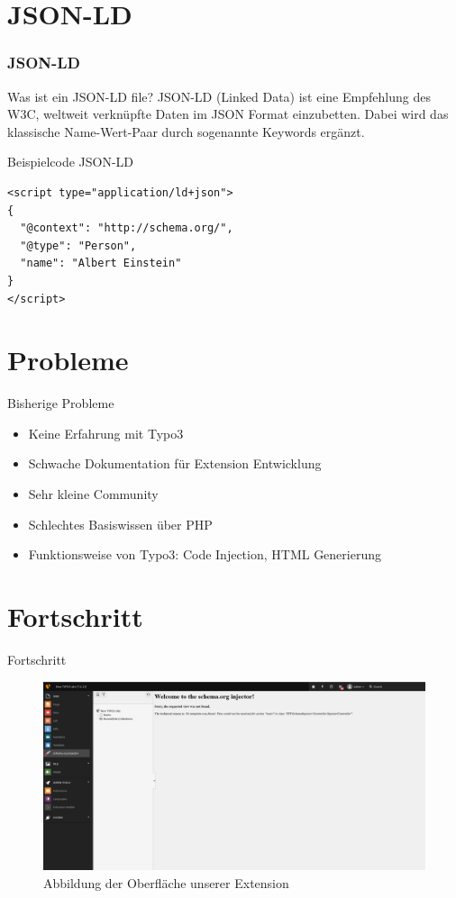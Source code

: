 \documentclass{beamer}
\begin{document}
\section{JSON-LD}

\begin{frame}[fragile]
\frametitle{JSON-LD}
\begin{block}{Was ist ein JSON-LD file?}
JSON-LD (Linked Data) ist eine Empfehlung des W3C, weltweit verknüpfte Daten im JSON Format einzubetten. Dabei wird das klassische Name-Wert-Paar durch sogenannte Keywords ergänzt.
\end{block}

\begin{block}{Beispielcode JSON-LD}
\begin{lstlisting}
<script type="application/ld+json">
{
  "@context": "http://schema.org/",
  "@type": "Person",
  "name": "Albert Einstein"
}
</script>
\end{lstlisting}
\end{block}
\end{frame}

\section{Probleme}

\begin{frame}{Bisherige Probleme}
\begin{itemize}
\item Keine Erfahrung mit Typo3
\item Schwache Dokumentation für Extension Entwicklung
\item Sehr kleine Community
\item Schlechtes Basiswissen über PHP
\item Funktionsweise von Typo3: Code Injection, HTML Generierung
\end{itemize}
\end{frame}


\section{Fortschritt}

\begin{frame}{Fortschritt}
\begin{figure}[ht]
\centering
\includegraphics[width=1.0\textwidth]{example_image.png}
\caption{Abbildung der Oberfläche unserer Extension}
\end{figure}
\end{frame}
\end{document}
